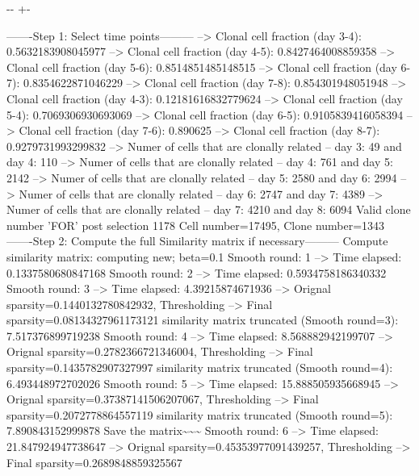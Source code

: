 \documentclass[letterpaper,10pt,english]{sphinxmanual}
\newlength\nbsphinxcodecellspacing
\begin{document}
{

\kern-\sphinxverbatimsmallskipamount\kern-\baselineskip
\kern+\FrameHeightAdjust\kern-\fboxrule
\vspace{\nbsphinxcodecellspacing}

\begin{sphinxVerbatim}[commandchars=\\\{\}]
-------Step 1: Select time points---------
--> Clonal cell fraction (day 3-4): 0.5632183908045977
--> Clonal cell fraction (day 4-5): 0.8427464008859358
--> Clonal cell fraction (day 5-6): 0.8514851485148515
--> Clonal cell fraction (day 6-7): 0.8354622871046229
--> Clonal cell fraction (day 7-8): 0.854301948051948
--> Clonal cell fraction (day 4-3): 0.12181616832779624
--> Clonal cell fraction (day 5-4): 0.7069306930693069
--> Clonal cell fraction (day 6-5): 0.9105839416058394
--> Clonal cell fraction (day 7-6): 0.890625
--> Clonal cell fraction (day 8-7): 0.9279731993299832
--> Numer of cells that are clonally related -- day 3: 49  and day 4: 110
--> Numer of cells that are clonally related -- day 4: 761  and day 5: 2142
--> Numer of cells that are clonally related -- day 5: 2580  and day 6: 2994
--> Numer of cells that are clonally related -- day 6: 2747  and day 7: 4389
--> Numer of cells that are clonally related -- day 7: 4210  and day 8: 6094
Valid clone number 'FOR' post selection 1178
Cell number=17495, Clone number=1343
-------Step 2: Compute the full Similarity matrix if necessary---------
Compute similarity matrix: computing new; beta=0.1
Smooth round: 1
--> Time elapsed: 0.1337580680847168
Smooth round: 2
--> Time elapsed: 0.5934758186340332
Smooth round: 3
--> Time elapsed: 4.39215874671936
--> Orignal sparsity=0.1440132780842932, Thresholding
--> Final sparsity=0.08134327961173121
similarity matrix truncated (Smooth round=3):  7.517376899719238
Smooth round: 4
--> Time elapsed: 8.568882942199707
--> Orignal sparsity=0.2782366721346004, Thresholding
--> Final sparsity=0.1435782907327997
similarity matrix truncated (Smooth round=4):  6.493448972702026
Smooth round: 5
--> Time elapsed: 15.888505935668945
--> Orignal sparsity=0.37387141506207067, Thresholding
--> Final sparsity=0.2072778864557119
similarity matrix truncated (Smooth round=5):  7.890843152999878
Save the matrix\textasciitilde{}\textasciitilde{}\textasciitilde{}
Smooth round: 6
--> Time elapsed: 21.847924947738647
--> Orignal sparsity=0.45353977091439257, Thresholding
--> Final sparsity=0.2689848859325567

\end{sphinxVerbatim}}
\end{document}
